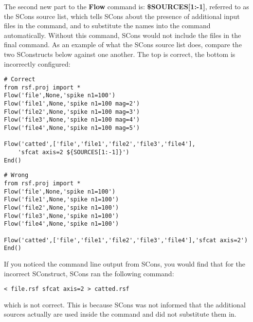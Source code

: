 The second new part to the \textbf{Flow} command is:
\textbf{\${SOURCES[1:-1]}}, referred to as the SCons source list,
which tells SCons about the presence of additional input files in the
command, and to substitute the names into the command automatically.
Without this command, SCons would not include the files in the final
command.  As an example of what the SCons source list does, compare
the two SConstructs below against one another.  The top is correct,
the bottom is incorrectly configured:
\lstset{language=python,showstringspaces=false}
\begin{lstlisting}
# Correct
from rsf.proj import *
Flow('file',None,'spike n1=100')
Flow('file1',None,'spike n1=100 mag=2')
Flow('file2',None,'spike n1=100 mag=3')
Flow('file3',None,'spike n1=100 mag=4')
Flow('file4',None,'spike n1=100 mag=5')

Flow('catted',['file','file1','file2','file3','file4'],
    'sfcat axis=2 ${SOURCES[1:-1]}')
End()
\end{lstlisting}
\begin{lstlisting}
# Wrong
from rsf.proj import *
Flow('file',None,'spike n1=100')
Flow('file1',None,'spike n1=100')
Flow('file2',None,'spike n1=100')
Flow('file3',None,'spike n1=100')
Flow('file4',None,'spike n1=100')

Flow('catted',['file','file1','file2','file3','file4'],'sfcat axis=2')
End()
\end{lstlisting}
If you noticed the command line output from SCons, you would find that for the incorrect SConstruct, SCons ran the following command:
\begin{verbatim}
< file.rsf sfcat axis=2 > catted.rsf
\end{verbatim}
which is not correct.  This is because SCons was not informed that the additional sources actually are used inside the command and did not substitute them in.  

